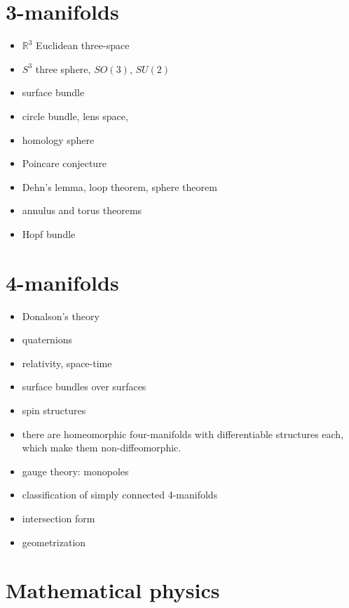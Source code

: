 \documentclass[12pt]{article}
\begin{document}
\section{3-manifolds}
\begin{itemize}
\item $\mathbb{R}^3$ Euclidean three-space
\item $S^3$ three sphere, $SO(3)$, $SU(2)$
\item surface bundle
\item circle bundle, lens space, 
\item homology sphere
\item Poincare conjecture
\item Dehn's lemma, loop theorem, sphere theorem
\item annulus and torus theorems
\item Hopf bundle
\end{itemize}

\section{4-manifolds}
\begin{itemize}
\item Donalson's theory
\item quaternions
\item relativity, space-time
\item surface bundles over surfaces
\item spin structures
\item there are homeomorphic four-manifolds with differentiable structures each, which make them non-diffeomorphic.
\item gauge theory: monopoles
\item classification of simply connected 4-manifolds
\item intersection form
\item geometrization
\end{itemize}

\section{Mathematical physics}

\end{document}
